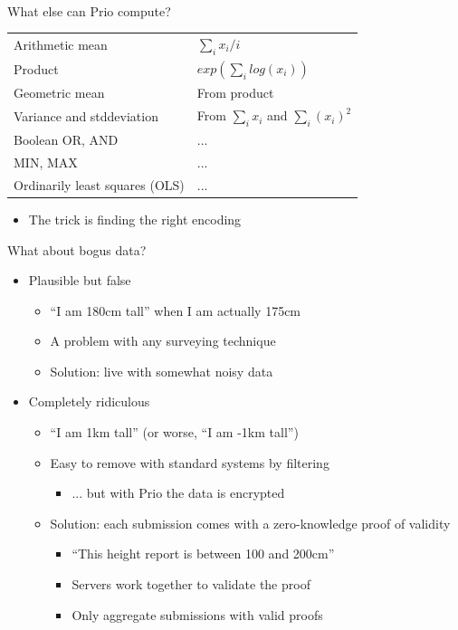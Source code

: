 \documentclass[helvetica]{beamer}
\begin{document}
\begin{frame}{What else can Prio compute?}

  \begin{tabular}{l l}
    Arithmetic mean & $\sum_i x_i / i$ \\
    Product & $exp(\sum_i log(x_i))$  \\
    Geometric mean & From product \\
    Variance and stddeviation & From $\sum_i x_i$ and $\sum_i (x_i)^2$ \\
    Boolean OR, AND & ... \\
    MIN, MAX & ... \\
    Ordinarily least squares (OLS) & ... \\
  \end{tabular}

  \vspace{2ex}
  \begin{itemize}
    \item[] The trick is finding the right encoding    
    \end{itemize}
\end{frame}

\begin{frame}{What about bogus data?}

  \begin{itemize}
  \item Plausible but false
    \begin{itemize}
    \item ``I am 180cm tall'' when I am actually 175cm
    \item A problem with any surveying technique
    \item Solution: live with somewhat noisy data
    \end{itemize}
  \item Completely ridiculous
    \begin{itemize}
    \item ``I am 1km tall'' (or worse, ``I am -1km tall'')
    \item Easy to remove with standard systems by filtering
      \begin{itemize}
      \item ... but with Prio the data is encrypted
      \end{itemize}
    \item Solution: each submission comes with a zero-knowledge proof of validity
    \begin{itemize}
      \item ``This height report is between 100 and 200cm''
      \item Servers work together to validate the proof
      \item Only aggregate submissions with valid proofs
      \end{itemize}
    \end{itemize}
  \end{itemize}
\end{frame}
\end{document}
